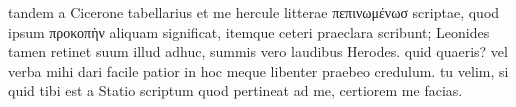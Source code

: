 


tandem a Cicerone tabellarius et me hercule litterae πεπινωμένωσ scriptae, quod ipsum προκοπὴν aliquam significat, itemque ceteri praeclara scribunt;
              Leonides tamen retinet suum illud adhuc, summis vero
            laudibus Herodes. quid quaeris? vel verba mihi dari facile
            patior in hoc meque libenter praebeo credulum. tu velim, si quid tibi est a
              Statio scriptum quod pertineat ad me, certiorem me facias.
